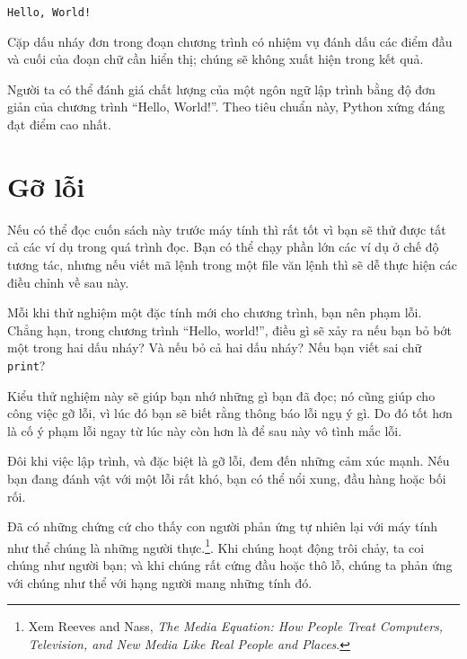 \documentclass[11pt]{book}
\begin{document}

\beforeverb
\begin{verbatim}
Hello, World!
\end{verbatim}
\afterverb
%
Cặp dấu nháy đơn trong đoạn chương trình có nhiệm vụ đánh dấu các điểm
đầu và cuối của đoạn chữ cần hiển thị; chúng sẽ không xuất hiện trong
kết quả.


Người ta có thể đánh giá chất lượng của một ngôn ngữ lập trình bằng
độ đơn giản của chương trình ``Hello, World!''. Theo tiêu chuẩn này,
Python xứng đáng đạt điểm cao nhất.

\section{Gỡ lỗi}

Nếu có thể đọc cuốn sách này trước máy tính thì rất tốt vì bạn sẽ 
thử được tất cả các ví dụ trong quá trình đọc. Bạn có thể chạy phần lớn
các ví dụ ở chế độ tương tác, nhưng nếu viết mã lệnh trong một file 
văn lệnh thì sẽ dễ thực hiện các điều chỉnh về sau này.

Mỗi khi thử nghiệm một đặc tính mới cho chương trình, bạn nên phạm lỗi.
Chẳng hạn, trong chương trình ``Hello, world!'', điều gì sẽ xảy ra
nếu bạn bỏ bớt một trong hai dấu nháy? Và nếu bỏ cả hai dấu nháy? Nếu bạn
viết sai chữ {\tt print}?


Kiểu thử nghiệm này sẽ giúp bạn nhớ những gì bạn đã đọc; nó cũng giúp cho
công việc gỡ lỗi, vì lúc đó bạn sẽ biết rằng thông báo lỗi ngụ ý gì. Do
đó tốt hơn là cố ý phạm lỗi ngay từ lúc này còn hơn là để sau này vô tình
mắc lỗi.

Đôi khi việc lập trình, và đặc biệt là gỡ lỗi, đem đến những cảm xúc mạnh.
Nếu bạn đang đánh vật với một lỗi rất khó, bạn có thể nổi xung, đầu hàng 
hoặc bối rối.

Đã có những chứng cứ cho thấy con người phản ứng tự nhiên lại với máy tính
như thể chúng là những người thực.\footnote{Xem Reeves and Nass, {\it The Media
    Equation: How People Treat Computers, Television, and New Media
    Like Real People and Places}.}.  Khi chúng hoạt động trôi chảy, ta 
coi chúng như người bạn; và khi chúng rất cứng đầu hoặc thô lỗ, chúng ta
phản ứng với chúng như thể với hạng người mang những tính đó.

\end{document}
